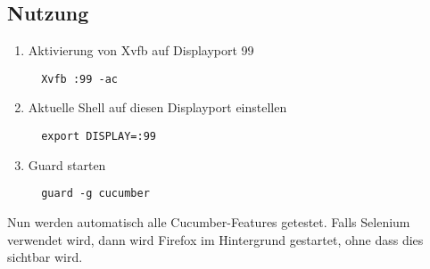 \subsection*{Nutzung}

\begin{enumerate}
 \item Aktivierung von Xvfb auf Displayport 99
 \begin{verbatim}
  Xvfb :99 -ac
 \end{verbatim}

 \item Aktuelle Shell auf diesen Displayport einstellen
 \begin{verbatim}
  export DISPLAY=:99
 \end{verbatim}

 \item Guard starten
 \begin{verbatim}
  guard -g cucumber
 \end{verbatim}
\end{enumerate}

Nun werden automatisch alle Cucumber-Features getestet. Falls Selenium verwendet wird, dann wird Firefox im Hintergrund gestartet, ohne dass dies sichtbar wird.



\newpage
\listoffigures

\lstlistoflistings




\renewcommand{\indexname}{Stichwortverzeichnis}
\printindex
